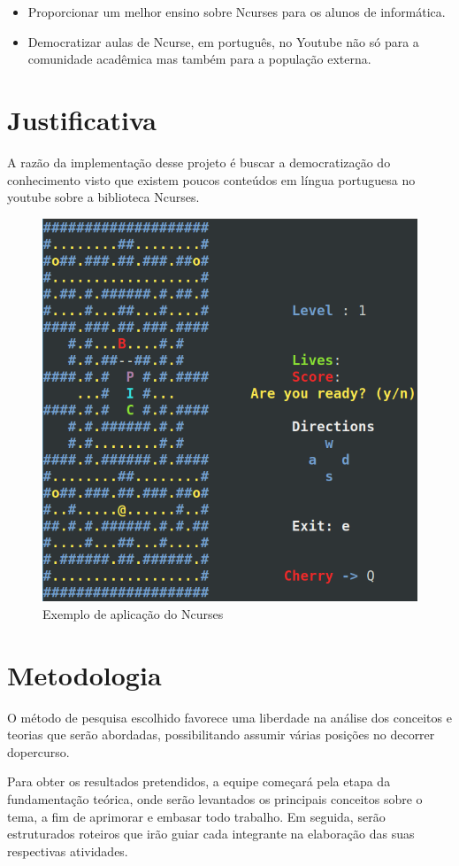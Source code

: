 \documentclass[a4paper,10pt]{article} %
\begin{document}
\begin{itemize}
 \item Proporcionar um melhor ensino sobre Ncurses para os alunos de informática.
 \item Democratizar aulas de Ncurse, em português,  no Youtube não só para a comunidade acadêmica mas também para a população externa.
\end{itemize}


\section{Justificativa}
A razão da implementação desse projeto é buscar a democratização do conhecimento visto que existem poucos conteúdos em língua portuguesa no youtube sobre a biblioteca Ncurses.


 \begin{figure}[ht] %
 \centering
 \includegraphics[width=.10\linewidth]{imagem.png}
 \caption{Exemplo de aplicação do Ncurses}
 \label{fig:xsort}
 \end{figure}




\section{Metodologia}
 
O método de pesquisa escolhido favorece uma liberdade na análise dos conceitos e teorias que serão abordadas, possibilitando assumir várias posições no decorrer dopercurso. 
 

Para obter os resultados pretendidos, a equipe começará pela etapa da fundamentação teórica, onde serão levantados os principais conceitos sobre o tema, a fim de aprimorar e embasar todo trabalho.
 Em seguida, serão estruturados roteiros  que irão guiar cada integrante na elaboração das suas respectivas atividades.
 
\end{document}
